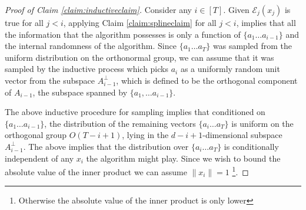 \begin{proof}[Proof of Claim \ref{claim:inductiveclaim}]
  Consider any $i \in [T]$. Given $\mathcal{E}_j(x_j)$ is true for all $j < i$, applying Claim \ref{claim:splineclaim} for all $j < i$, implies that all the information that the algorithm possesses is only a function of $\{a_1 \ldots a_{i-1}\}$ and the internal randomness of the algorithm. Since $\{a_1 \ldots a_T\}$ was sampled from the uniform distribution on the orthonormal group, we can assume that it was sampled by the inductive process which picks $a_i$ as a uniformly random unit vector from the subspace $A_{i-1}^{\perp}$, which is defined to be the orthogonal component of $A_{i-1}$, the subspace spanned by $\{a_1, \ldots a_{i-1}\}$.

  The above inductive procedure for sampling implies that conditioned on $\{a_1 \ldots a_{i-1}\}$, the distribution of the remaining vectors $\{a_i \ldots a_T\}$ is uniform on the orthogonal group $O(T - i + 1)$, lying in the $d-i + 1$-dimensional subspace $A_{i-1}^{\perp}$. The above implies that the distribution over $\{a_i \ldots a_T\}$ is conditionally independent of any $x_i$ the algorithm might play. Since we wish to bound the absolute value of the inner product we can assume $\|x_i\| = 1$ \footnote{Otherwise the absolute value of the inner product is only lower}.


\end{proof}
